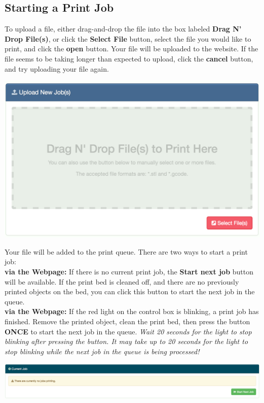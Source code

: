   \subsection{Starting a Print Job}
      To upload a file, either drag-and-drop the file into the box labeled \textbf{Drag N' Drop File(s)}, or
      click the \textbf{Select File} button, select the file you would like
      to print, and click the \textbf{open} button.  Your file will be uploaded to the website.  If the file seems to be taking longer than expected to upload, click the \textbf{cancel} button, and try uploading your file again.
      \begin{center}
      \includegraphics[scale=.25]{images/upload-job.png}
    \end{center}
	Your file will be added to the print queue.  There are two ways to start a print job:\\	
	\textbf{via the Webpage:} If there is no current print job, the \textbf{Start next job} button will be available.  If the print bed is cleaned off, and there are no previously printed objects on the bed, you can click this button to start the next job in the queue.\\
	\textbf{via the Webpage:} If the red light on the control box is blinking, a print job has finished.  Remove the printed object, clean the print bed, then press the button \textbf{ONCE} to start the next job in the queue.  \emph{Wait 20 seconds for the light to stop blinking after pressing the button.  It may take up to 20 seconds for the light to stop blinking while the next job in the queue is being processed!} 
      \begin{center}
      \includegraphics[scale=.3]{images/start-next.png}
    \end{center}


